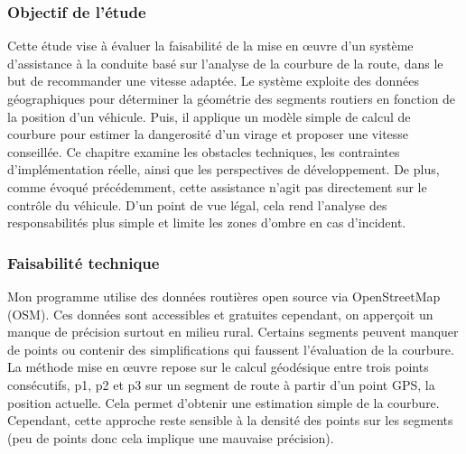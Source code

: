 

\subsubsection{Objectif de l'étude}
Cette étude vise à évaluer la faisabilité de la mise en œuvre d’un système d’assistance à la conduite basé sur l’analyse de la courbure de la route, dans le but de recommander une vitesse adaptée. Le système exploite des données géographiques pour déterminer la géométrie des segments routiers en fonction de la position d’un véhicule. Puis, il applique un modèle simple de calcul de courbure pour estimer la dangerosité d’un virage et proposer une vitesse conseillée. Ce chapitre examine les obstacles techniques, les contraintes d’implémentation réelle, ainsi que les perspectives de développement.
De plus, comme évoqué précédemment, cette assistance n’agit pas directement sur le contrôle du véhicule. D’un point de vue légal, cela rend l’analyse des responsabilités plus simple et limite les zones d’ombre en cas d’incident.

\subsubsection{Faisabilité technique}
Mon programme utilise des données routières open source via OpenStreetMap (OSM). Ces données sont accessibles et gratuites cependant, on apperçoit un manque de précision surtout en milieu rural. Certains segments peuvent manquer de points ou contenir des simplifications qui faussent l’évaluation de la courbure.
La méthode mise en œuvre repose sur le calcul géodésique entre trois points consécutifs, p1, p2 et p3 sur un segment de route à partir d'un point GPS, la position actuelle. Cela permet d’obtenir une estimation simple de la courbure.
Cependant, cette approche reste sensible à la densité des points sur les segments (peu de points donc cela implique une mauvaise précision).

